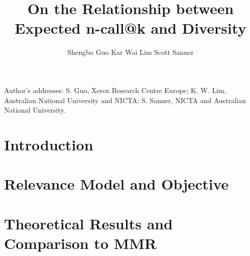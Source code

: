 \documentclass[prodmode,acmtecs]{acmsmall}
\begin{document}


\title{On the Relationship between Expected n-call@k and Diversity}
\author{Shengbo Guo
Kar Wai Lim
Scott Sanner
}

\begin{abstract}

\end{abstract}





\begin{bottomstuff}
Author's addresses: S. Guo, Xerox Research Centre Europe; K. W. Lim, Australian National University and NICTA; S. Sanner, NICTA and Australian National University.
\end{bottomstuff}

\maketitle



\section{Introduction}
\label{sec:intro}


\section{Relevance Model and Objective}
\label{sec:model}


\section{Theoretical Results and Comparison to MMR}
\label{sec:theory}

\end{document}
